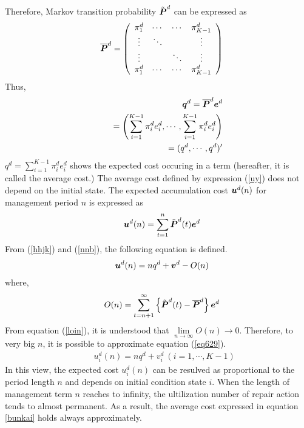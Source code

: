 Therefore, Markov transition probability $\tilde{\mbox{\boldmath$P$}}^d$ can be expressed as 
\begin{eqnarray}
&& \overline{\mbox{\boldmath$P$}}^d=\left(
\begin{array}{cccc}
\pi_{1}^d & \cdots & \cdots & \pi_{K-1}^d \\
\vdots & \ddots &        & \vdots \\
\vdots &        & \ddots & \vdots \\
\pi_{1}^d & \cdots & \cdots & \pi_{K-1}^d
\end{array}
\right)
\end{eqnarray}
Thus, 
\begin{eqnarray}
&& \mbox{\boldmath$q$}^d=\overline{\mbox{\boldmath$P$}}^d\mbox{\boldmath$e$}^d \nonumber \\
&& \hspace{5mm} =\left(\sum_{i=1}^{K-1} \pi_i^d e_i^d,\cdots,\sum_{i=1}^{K-1} \pi_i^de_i^d\right) \nonumber \\
&& \hspace{5mm} =(q^d,\cdots,q^d)^\prime \label{uy}
\end{eqnarray}
$q^d=\sum_{i=1}^{K-1}\pi_i^d e_i^d$ shows the expected cost occuring in a term (hereafter, it is called the average cost.) The average cost defined by expression (\ref{uy}) does not depend on the initial state. The expected accumulation cost $\mbox{\boldmath$u$} ^d(n) $ for management period $n$ is expressed as
\begin{eqnarray}
&& \mbox{\boldmath$u$}^d(n)=\sum_{t=1}^n \tilde{\mbox{\boldmath$P$}}^d(t)\mbox{\boldmath$e$}^d\label{nnb}
\end{eqnarray}
From (\ref{hhjk}) and (\ref{nnb}), the following equation is defined. 
\begin{eqnarray}
&& \mbox{\boldmath$u$}^d(n)=nq^d+\mbox{\boldmath$v$}^d-O(n) \label{eq629}
\end{eqnarray}
where,
\begin{eqnarray}
&& O(n)=\sum_{t=n+1}^\infty \left\{\tilde{\mbox{\boldmath$P$}}^d(t)-\overline{\mbox{\boldmath$P$}}^d\right\}\mbox{\boldmath$e$}^d
\end{eqnarray}
From equation  (\ref{loin}), it is understood that  $\mathop {\lim }\limits_{n \to \infty } O(n) \to 0$. Therefore, to very big $n$, it is possible to approximate equation (\ref{eq629}).
\begin{eqnarray}
&& u_i^d(n) = nq^d + v_i^d ~(i=1,\cdots,K-1) \label{bunkai}
\end{eqnarray}
In this view, the expected cost $u_i^d(n)$ can be resulved as proportional to the period length $n$ and depends on initial condition state $i$. When the length of management term $n$ reaches to infinity, the ultilization number of repair action tends to almost permanent. As a result, the average cost expressed in equation \ref{bunkai} holds always approximately.

